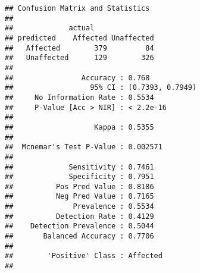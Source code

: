 \documentclass[
]{article}
\newenvironment{Shaded}{\begin{snugshade}}{\end{snugshade}}
\newcommand{\AttributeTok}[1]{\textcolor[rgb]{0.77,0.63,0.00}{#1}}
\newcommand{\CommentTok}[1]{\textcolor[rgb]{0.56,0.35,0.01}{\textit{#1}}}
\newcommand{\FunctionTok}[1]{\textcolor[rgb]{0.00,0.00,0.00}{#1}}
\newcommand{\NormalTok}[1]{#1}
\newcommand{\OtherTok}[1]{\textcolor[rgb]{0.56,0.35,0.01}{#1}}
\newcommand{\SpecialCharTok}[1]{\textcolor[rgb]{0.00,0.00,0.00}{#1}}
\newcommand{\StringTok}[1]{\textcolor[rgb]{0.31,0.60,0.02}{#1}}
\begin{document}
\begin{verbatim}
## Confusion Matrix and Statistics
## 
##             actual
## predicted    Affected Unaffected
##   Affected        379         84
##   Unaffected      129        326
##                                           
##                Accuracy : 0.768           
##                  95% CI : (0.7393, 0.7949)
##     No Information Rate : 0.5534          
##     P-Value [Acc > NIR] : < 2.2e-16       
##                                           
##                   Kappa : 0.5355          
##                                           
##  Mcnemar's Test P-Value : 0.002571        
##                                           
##             Sensitivity : 0.7461          
##             Specificity : 0.7951          
##          Pos Pred Value : 0.8186          
##          Neg Pred Value : 0.7165          
##              Prevalence : 0.5534          
##          Detection Rate : 0.4129          
##    Detection Prevalence : 0.5044          
##       Balanced Accuracy : 0.7706          
##                                           
##        'Positive' Class : Affected        
## 
\end{verbatim}

\begin{Shaded}
\end{Shaded}
\end{document}
